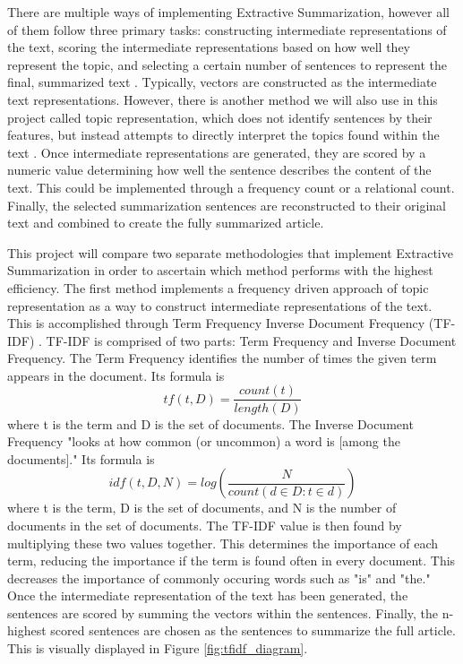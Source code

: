 \documentclass{IEEEtran}
\begin{document}
There are multiple ways of implementing Extractive Summarization, however all of them follow three primary tasks: constructing intermediate representations of the text, scoring the intermediate representations based on how well they represent the topic, and selecting a certain number of sentences to represent the final, summarized text \cite{related_summarization}. Typically, vectors are constructed as the intermediate text representations. However, there is another method we will also use in this project called topic representation, which does not identify sentences by their features, but instead attempts to directly interpret the topics found within the text \cite{related_summarization}. Once intermediate representations are generated, they are scored by a numeric value determining how well the sentence describes the content of the text. This could be implemented through a frequency count or a relational count. Finally, the selected summarization sentences are reconstructed to their original text and combined to create the fully summarized article.

This project will compare two separate methodologies that implement Extractive Summarization in order to ascertain which method performs with the highest efficiency. The first method implements a frequency driven approach of topic representation as a way to construct intermediate representations of the text. This is accomplished through Term Frequency Inverse Document Frequency (TF-IDF) \cite{tf-idf}. TF-IDF is comprised of two parts: Term Frequency and Inverse Document Frequency. The Term Frequency identifies the number of times the given term appears in the document. Its formula is 
\[tf(t, D) = \frac{count(t)}{length(D)}\]
where t is the term and D is the set of documents. The Inverse Document Frequency "looks at how common (or uncommon) a word is [among the documents]." \cite{tf-idf} Its formula is
\[idf(t, D, N) = log(\frac{N}{count(d \in D:t \in d)})\]
where t is the term, D is the set of documents, and N is the number of documents in the set of documents. The TF-IDF value is then found by multiplying these two values together. This determines the importance of each term, reducing the importance if the term is found often in every document. This decreases the importance of commonly occuring words such as "is" and "the." Once the intermediate representation of the text has been generated, the sentences are scored by summing the vectors within the sentences. Finally, the n-highest scored sentences are chosen as the sentences to summarize the full article. This is visually displayed in Figure \ref{fig:tfidf_diagram}.
\end{document}
